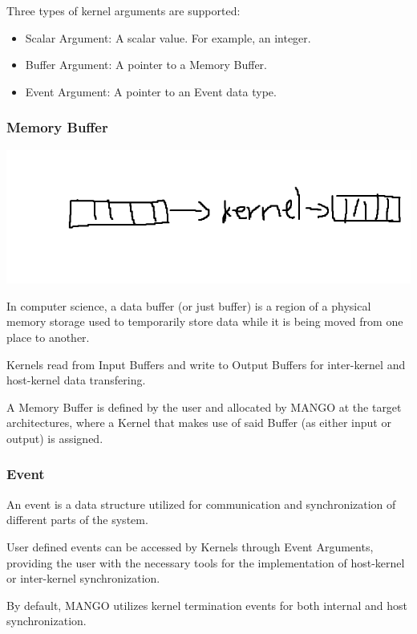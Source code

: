 Three types of kernel arguments are supported: 
\begin{itemize}
    \item Scalar Argument: A scalar value. For example, an integer.
    \item Buffer Argument: A pointer to a Memory Buffer.
    \item Event Argument: A pointer to an Event data type.
\end{itemize}

\subsubsection{Memory Buffer}
\includegraphics[scale=0.5]{img/kernel_buffer.png}

In computer science, a data buffer (or just buffer) is a region of a physical memory storage used to temporarily store data while it is being moved from one place to another. \cite{buffer_wikipedia}

Kernels read from Input Buffers and write to Output Buffers for inter-kernel and host-kernel data transfering.

A Memory Buffer is defined by the user and allocated by MANGO at the target architectures, where a Kernel that makes use of said Buffer (as either input or output) is assigned.

\subsubsection{Event}

An event is a data structure utilized for communication and synchronization of different parts of the system.

User defined events can be accessed by Kernels through Event Arguments, providing the user with the necessary tools for the implementation of host-kernel or inter-kernel synchronization.

By default, MANGO utilizes kernel termination events for both internal and host synchronization.

